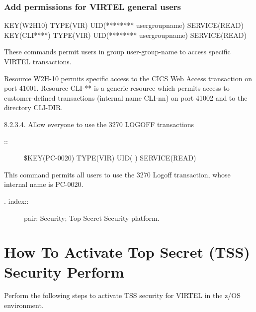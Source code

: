 \documentclass[letterpaper,10pt,english]{sphinxmanual}
\begin{document}
\subsubsection{Add permissions for VIRTEL general users}
\label{\detokenize{Installation_Guide:add-permissions-for-virtel-general-users}}
\begin{sphinxVerbatim}[commandchars=\\\{\}]
\PYGZdl{}KEY(W2H\PYGZhy{}10) TYPE(VIR) UID(******** user\PYGZhy{}group\PYGZhy{}name) SERVICE(READ)
\PYGZdl{}KEY(CLI\PYGZhy{}****) TYPE(VIR) UID(******** user\PYGZhy{}group\PYGZhy{}name) SERVICE(READ)
\end{sphinxVerbatim}


These commands permit users in group user-group-name to access specific VIRTEL transactions.

Resource W2H-10 permits specific access to the CICS Web Access transaction on port 41001. Resource CLI-** is a generic resource which permits access to customer-defined transactions (internal name CLI-nn) on port 41002 and to the directory CLI-DIR.

8.2.3.4. Allow everyone to use the 3270 LOGOFF transactions
\begin{description}
\item[{::}] \leavevmode
\$KEY(PC-0020) TYPE(VIR) UID(\sphinxstylestrong{****} \sphinxstylestrong{****}) SERVICE(READ)

\end{description}


This command permits all users to use the 3270 Logoff transaction, whose internal name is PC-0020.
\begin{description}
\item[{. index::}] \leavevmode
pair: Security; Top Secret Security platform.

\end{description}


\section{How To Activate Top Secret (TSS) Security Perform}
\label{\detokenize{Installation_Guide:how-to-activate-top-secret-tss-security-perform}}
Perform the following steps to activate TSS security for VIRTEL in the z/OS environment.
\end{document}

